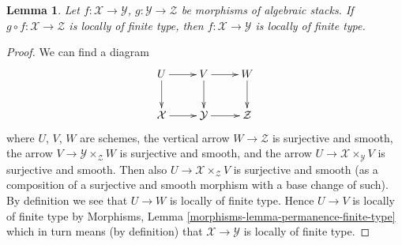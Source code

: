 \documentclass[10pt,a4paper]{amsart}
\theoremstyle{plain}
\newtheorem{lemma}[subsection]{Lemma}
\theoremstyle{definition}
\theoremstyle{remark}
\numberwithin{equation}{subsection}
\begin{document}
\begin{lemma}
\label{lemma-finite-type-permanence}
Let $f : \mathcal{X} \to \mathcal{Y}$,
$g : \mathcal{Y} \to \mathcal{Z}$ be morphisms of algebraic stacks.
If $g \circ f : \mathcal{X} \to \mathcal{Z}$ is locally of finite type,
then $f : \mathcal{X} \to \mathcal{Y}$ is locally of finite type.
\end{lemma}

\begin{proof}
We can find a diagram
$$
\xymatrix{
U \ar[r] \ar[d] & V \ar[r] \ar[d] & W \ar[d] \\
\mathcal{X} \ar[r] & \mathcal{Y} \ar[r] & \mathcal{Z}
}
$$
where $U$, $V$, $W$ are schemes, the vertical arrow $W \to \mathcal{Z}$
is surjective and smooth, the arrow $V \to \mathcal{Y} \times_\mathcal{Z} W$
is surjective and smooth, and the arrow
$U \to \mathcal{X} \times_\mathcal{Y} V$ is surjective and smooth.
Then also $U \to \mathcal{X} \times_\mathcal{Z} V$ is surjective and
smooth (as a composition of a surjective and smooth morphism with a
base change of such). By definition we see that $U \to W$ is locally
of finite type. Hence $U \to V$ is locally of finite type by
Morphisms, Lemma \ref{morphisms-lemma-permanence-finite-type}
which in turn means (by definition) that $\mathcal{X} \to \mathcal{Y}$
is locally of finite type.
\end{proof}
\end{document}

